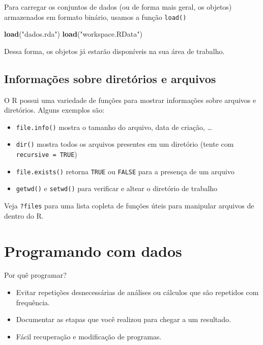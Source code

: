 \documentclass[10pt,a4paper]{book}
\newenvironment{Shaded}{\begin{snugshade}}{\end{snugshade}}
\newcommand{\KeywordTok}[1]{\textcolor[rgb]{0.13,0.29,0.53}{\textbf{#1}}}
\newcommand{\StringTok}[1]{\textcolor[rgb]{0.31,0.60,0.02}{#1}}
\newcommand{\NormalTok}[1]{#1}
\providecommand{\tightlist}{%
  \setlength{\itemsep}{0pt}\setlength{\parskip}{0pt}}
\begin{document}
Para carregar os conjuntos de dados (ou de forma mais geral, os objetos)
armazenados em formato binário, usamos a função \texttt{load()}

\begin{Shaded}
\begin{Highlighting}[]
\KeywordTok{load}\NormalTok{(}\StringTok{"dados.rda"}\NormalTok{)}
\KeywordTok{load}\NormalTok{(}\StringTok{"workspace.RData"}\NormalTok{)}
\end{Highlighting}
\end{Shaded}

Dessa forma, os objetos já estarão disponíveis na sua área de trabalho.

\section{Informações sobre diretórios e
arquivos}\label{informauxe7uxf5es-sobre-diretuxf3rios-e-arquivos}

O R possui uma variedade de funções para mostrar informações sobre
arquivos e diretórios. Alguns exemplos são:

\begin{itemize}
\tightlist
\item
  \texttt{file.info()} mostra o tamanho do arquivo, data de criação,
  \ldots{}
\item
  \texttt{dir()} mostra todos os arquivos presentes em um diretório
  (tente com \texttt{recursive\ =\ TRUE})
\item
  \texttt{file.exists()} retorna \texttt{TRUE} ou \texttt{FALSE} para a
  presença de um arquivo
\item
  \texttt{getwd()} e \texttt{setwd()} para verificar e altear o
  diretório de trabalho
\end{itemize}

Veja \texttt{?files} para uma lista copleta de funções úteis para
manipular arquivos de dentro do R.

\chapter{Programando com dados}\label{programando-com-dados}

Por quê programar?

\begin{itemize}
\tightlist
\item
  Evitar repetições desnecessárias de análises ou cálculos que são
  repetidos com frequência.
\item
  Documentar as etapas que você realizou para chegar a um resultado.
\item
  Fácil recuperação e modificação de programas.
\end{itemize}
\end{document}
